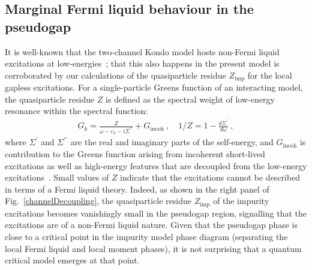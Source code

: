 \documentclass[reprint,hidelinks,onecolumn]{revtex4-2}
\begin{document}
\subsection{Marginal Fermi liquid behaviour in the pseudogap}\label{marginalFL}
It is well-known that the two-channel Kondo model hosts non-Fermi liquid excitations at low-energies~\cite{Tsvelick_weigmann_mchannel_1985,emery_kivelson}; that this also happens in the present model is corroborated by our calculations of the quasiparticle residue \(Z_\text{imp}\) for the local gapless excitations. For a single-particle Greens function of an interacting model, the quasiparticle residue \(Z\) is defined as the spectral weight of low-energy resonance within the spectral function:
\begin{equation}\begin{aligned}
	G_k = \frac{Z}{\omega - \varepsilon_k - i \Sigma^{\prime\prime}} + G_\text{incoh}~,\quad 1/Z = 1- \frac{d \Sigma^{\prime}}{d\omega}~,
\end{aligned}\end{equation}
where \(\Sigma^\prime\) and \(\Sigma^{\prime\prime}\) are the real and imaginary parts of the self-energy, and \(G_\text{incoh}\) is contribution to the Greens function arising from incoherent short-lived excitations as well as high-energy features that are decoupled from the low-energy excitations~\cite{varma-physrevlett.63.1996}. Small values of \(Z\) indicate that the excitations cannot be described in terms of a Fermi liquid theory. Indeed, as shown in the right panel of Fig.~\ref{channelDecoupling}, the quasiparticle residue \(Z_\text{imp}\) of the impurity excitations becomes vanishingly small in the pseudogap region, signalling that the excitations are of a non-Fermi liquid nature. Given that the pseudogap phase is close to a critical point in the impurity model phase diagram (separating the local Fermi liquid and local moment phases), it is not surprising that a quantum critical model emerges at that point.
\end{document}
